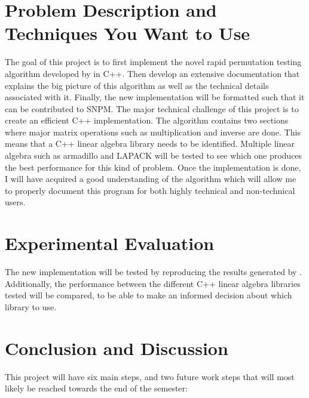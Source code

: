 \documentclass[10pt,letterpaper]{article}
\begin{document}
\section{Problem Description and Techniques You Want to Use}
The goal of this project is to first implement the novel rapid permutation testing algorithm developed by \cite{vamsi} in C++. Then develop an extensive documentation that explains the big picture of this algorithm as well as the technical details associated with it. Finally, the new implementation will be formatted such that it can be contributed to SNPM. 
\newline
\newline
The major technical challenge of this project is to create an efficient C++ implementation. The algorithm contains two sections where major matrix operations such as multiplication and inverse are done. This means that a C++ linear algebra library needs to be identified. Multiple linear algebra such as armadillo and LAPACK will be tested to see which one produces the best performance for this kind of problem.
\newline
\newline
Once the implementation is done, I will have acquired a good understanding of the algorithm which will allow me to properly document this program for both highly technical and non-technical users.


\section{Experimental Evaluation}
 
The new implementation will be tested by reproducing the results generated by \cite{vamsi}. Additionally, the performance between the different C++ linear algebra libraries tested will be compared, to be able to make an informed decision about which library to use.

 
\section{Conclusion and Discussion}
This project will have six main steps, and two future work steps that will most likely be reached towards the end of the semester:
\end{document}
